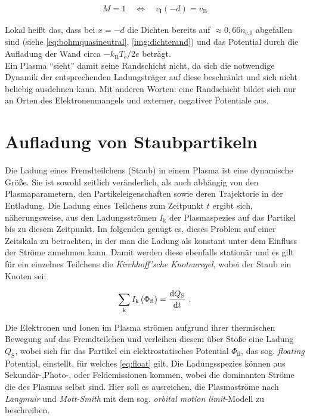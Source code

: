 \documentclass[numbers=noenddot,a4paper,notitlepage,twoside,BCOR15mm]{scrbook}
\newcommand{\diff}{\textnormal{d}}
\newcommand{\ix}[1]{_\text{#1}}
\newcommand{\tilt}[1]{\textit{#1}}
\begin{document}
				\begin{align}
					M=1 \quad \Leftrightarrow \quad v\ix{I}\left(-d\right)=v\ix{B} \label{eq:bohmkritzwei}
				\end{align}

			Lokal heißt das, dass bei $x=-d$ die Dichten bereits auf $\approx0,66n\ix{e,0}$ abgefallen sind (siehe \ref{eq:bohmquasineutral}, \autoref{img:dichterand}) und das Potential durch die Aufladung der Wand circa $-k\ix{B}T\ix{e}/2e$ beträgt.\\
			Ein Plasma "`sieht"' damit seine Randschicht nicht, da sich die notwendige Dynamik der entsprechenden Ladungsträger auf diese beschränkt und sich nicht beliebig ausdehnen kann. Mit anderen Worten: eine Randschicht bildet sich nur an Orten des Elektronenmangels und externer, negativer Potentiale aus.

		\section{Aufladung von Staubpartikeln}\label{sub:ströme}

			Die Ladung eines Fremdteilchens (Staub) in einem Plasma ist eine dynamische Größe. Sie ist sowohl zeitlich veränderlich, als auch abhängig von den Plasmaparametern, den Partikeleigenschaften sowie deren Trajektorie in der Entladung. Die Ladung eines Teilchens zum Zeitpunkt $t$ ergibt sich, näherungsweise, aus den Ladungsströmen $I\ix{k}$ der Plasmaspezies auf das Partikel bis zu diesem Zeitpunkt. Im folgenden genügt es, dieses Problem auf einer Zeitskala zu betrachten, in der man die Ladung als konstant unter dem Einfluss der Ströme annehmen kann. Damit werden diese ebenfalls stationär und es gilt für ein einzelnes Teilchens die \tilt{Kirchhoff'sche Knotenregel}, wobei der Staub ein Knoten sei:

				\begin{align}
					\sum_{\text{k}} I\ix{k}\left(\Phi\ix{fl}\right)=\frac{\diff Q\ix{S}}{\diff t} \,\, . \label{eq:float}
				\end{align}

		Die Elektronen und Ionen im Plasma strömen aufgrund ihrer thermischen Bewegung auf das Fremdteilchen und verleihen diesem über Stöße eine Ladung $Q\ix{S}$, wobei sich für das Partikel ein elektrostatisches Potential $\Phi\ix{fl}$, das sog. \tilt{floating} Potential, einstellt, für welches \autoref{eq:float} gilt. Die Ladungsspezies können aus Sekundär-,Photo-, oder Feldemissionen kommen, wobei die dominanten Ströme die des Plasmas selbst sind. Hier soll es ausreichen, die Plasmaströme nach  \tilt{Langmuir} und \tilt{Mott-Smith} mit dem sog. \tilt{orbital motion limit}-Modell \cite{Langmuir26} zu beschreiben. 
\end{document}
